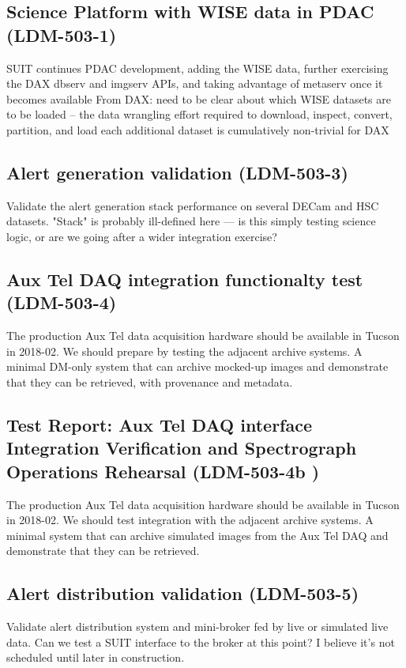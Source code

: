 \subsection{Science Platform with WISE data in PDAC \textbf{(LDM-503-1)}\label{LDM-503-1}}
SUIT continues PDAC development, adding the WISE data, further exercising the DAX dbserv and imgserv APIs, and taking advantage of metaserv once it becomes available
 \newline
From DAX: need to be clear about which WISE datasets are to be loaded -- the data wrangling effort required to download, inspect, convert, partition, and load each additional dataset is cumulatively non-trivial for DAX



\subsection{Alert generation validation \textbf{(LDM-503-3)}\label{LDM-503-3}}
Validate the alert generation stack performance on several DECam and HSC datasets.
 \newline
"Stack" is probably ill-defined here — is this simply testing science logic, or are we going after a wider integration exercise?
\subsection{Aux Tel DAQ integration functionalty test \textbf{(LDM-503-4)}\label{LDM-503-4}}
The production Aux Tel data acquisition hardware should be available in Tucson in 2018-02. We should prepare by testing the adjacent archive systems.
 \newline
A minimal DM-only system that can archive mocked-up images and demonstrate that they can be retrieved, with provenance and metadata.
\subsection{Test Report: Aux Tel DAQ interface Integration Verification and Spectrograph Operations Rehearsal \textbf{(LDM-503-4b )}\label{LDM-503-4b }}
The production Aux Tel data acquisition hardware should be available in Tucson in 2018-02. We should test integration with the adjacent archive systems.
 \newline
A minimal system that can archive simulated images from the Aux Tel DAQ and demonstrate that they can be retrieved.
\subsection{Alert distribution validation \textbf{(LDM-503-5)}\label{LDM-503-5}}
Validate alert distribution system and mini-broker fed by live or simulated live data.
 \newline
Can we test a SUIT interface to the broker at this point? I believe it's not scheduled until later in construction.
